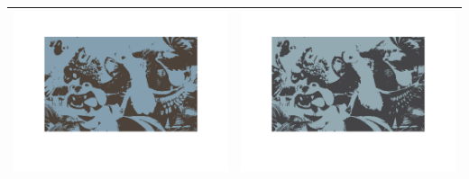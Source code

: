 \documentclass[fleqn]{article}
\begin{document}
\begin{center}
\begin{longtable}{ c | c }
	\includegraphics[scale=0.4]{./pics/task1and2/rio_k=2_random/K=2_iteration_3_random_2_rio.png} & \includegraphics[scale=0.4]{./pics/task1and2/rio_k=2_random/K=2_iteration_4_random_2_rio.png} \\\hline

\end{longtable}
\end{center}
\end{document}
